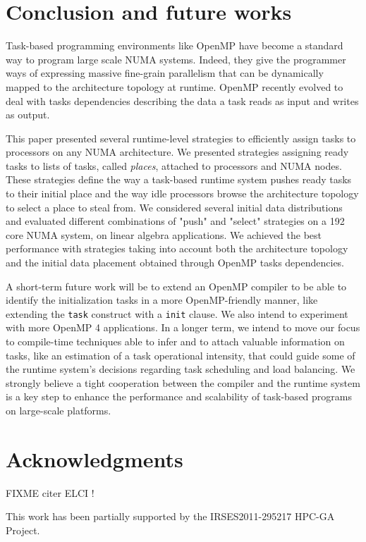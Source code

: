 \documentclass{Styles/llncs}
\begin{document}

\section{Conclusion and future works}
Task-based programming environments like OpenMP have become a standard way to program large scale NUMA systems.
Indeed, they give the programmer ways of expressing massive fine-grain parallelism that can be dynamically mapped to the architecture topology at runtime.
OpenMP recently evolved to deal with tasks dependencies describing the data a task reads as input and writes as output. 

This paper presented several runtime-level strategies to efficiently assign tasks to processors on any NUMA architecture. We presented strategies assigning ready tasks to lists of tasks, called \emph{places}, attached to processors and NUMA nodes. These strategies define the way a task-based runtime system pushes ready tasks to their initial place and the way idle processors browse the architecture topology to select a place to steal from. We considered several initial data distributions and evaluated different combinations of "push" and "select" strategies on a 192 core NUMA system, on linear algebra applications. We achieved the best performance with strategies taking into account both the architecture topology and the initial data placement obtained through OpenMP tasks dependencies.

A short-term future work will be to extend an OpenMP compiler to be able to identify the initialization tasks in a more OpenMP-friendly manner, like extending the \verb!task! construct with a \verb!init! clause. We also intend to experiment with more OpenMP 4 applications.
In a longer term, we intend to move our focus to compile-time techniques able to infer and to attach valuable information on tasks, like an estimation of a task operational intensity, that could guide some of the runtime system's decisions regarding task scheduling and load balancing. We strongly believe a tight cooperation between the compiler and the runtime system is a key step to enhance the performance and scalability of task-based programs on large-scale platforms.

\section*{Acknowledgments}

FIXME citer ELCI !

This work has been partially supported by the IRSES2011-295217
HPC-GA Project.

  \small 
  
\end{document}

